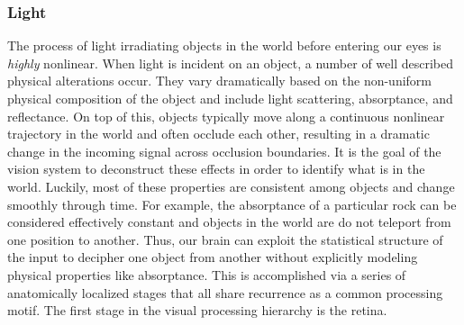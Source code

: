 \subsubsection{Light}
The process of light irradiating objects in the world before entering our eyes is \textit{highly} nonlinear. When light is incident on an object, a number of well described physical alterations occur. They vary dramatically based on the non-uniform physical composition of the object and include light scattering, absorptance, and reflectance. On top of this, objects typically move along a continuous nonlinear trajectory in the world and often occlude each other, resulting in a dramatic change in the incoming signal across occlusion boundaries. It is the goal of the vision system to deconstruct these effects in order to identify what is in the world. Luckily, most of these properties are consistent among objects and change smoothly through time. For example, the absorptance of a particular rock can be considered effectively constant and objects in the world are do not teleport from one position to another. Thus, our brain can exploit the statistical structure of the input to decipher one object from another without explicitly modeling physical properties like absorptance. This is accomplished via a series of anatomically localized stages that all share recurrence as a common processing motif. The first stage in the visual processing hierarchy is the retina.


